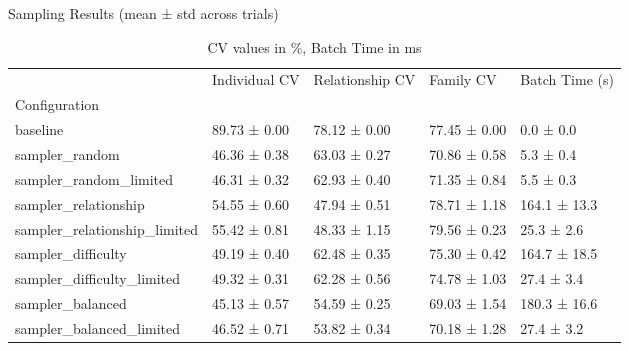 \begin{table}[h]
\centering
\caption{Sampling Results (mean ± std across trials)}
\small
\begin{tabular}{lllll}
\toprule
 & Individual CV & Relationship CV & Family CV & Batch Time (s) \\
Configuration &  &  &  &  \\
\midrule
baseline & 89.73 ± 0.00 & 78.12 ± 0.00 & 77.45 ± 0.00 & 0.0 ± 0.0 \\
sampler_random & 46.36 ± 0.38 & 63.03 ± 0.27 & 70.86 ± 0.58 & 5.3 ± 0.4 \\
sampler_random_limited & 46.31 ± 0.32 & 62.93 ± 0.40 & 71.35 ± 0.84 & 5.5 ± 0.3 \\
sampler_relationship & 54.55 ± 0.60 & 47.94 ± 0.51 & 78.71 ± 1.18 & 164.1 ± 13.3 \\
sampler_relationship_limited & 55.42 ± 0.81 & 48.33 ± 1.15 & 79.56 ± 0.23 & 25.3 ± 2.6 \\
sampler_difficulty & 49.19 ± 0.40 & 62.48 ± 0.35 & 75.30 ± 0.42 & 164.7 ± 18.5 \\
sampler_difficulty_limited & 49.32 ± 0.31 & 62.28 ± 0.56 & 74.78 ± 1.03 & 27.4 ± 3.4 \\
sampler_balanced & 45.13 ± 0.57 & 54.59 ± 0.25 & 69.03 ± 1.54 & 180.3 ± 16.6 \\
sampler_balanced_limited & 46.52 ± 0.71 & 53.82 ± 0.34 & 70.18 ± 1.28 & 27.4 ± 3.2 \\
\bottomrule
\end{tabular}
\caption*{CV values in \%, Batch Time in ms}
\end{table}
